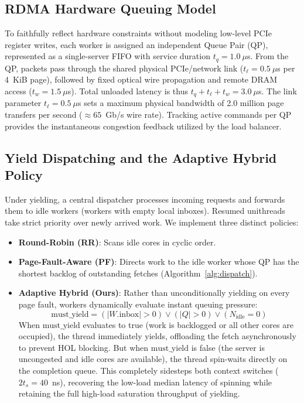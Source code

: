 \subsection{RDMA Hardware Queuing Model}
To faithfully reflect hardware constraints without modeling low-level PCIe register writes, each worker is assigned an independent Queue Pair (QP), represented as a single-server FIFO with service duration $t_q = 1.0~\mu$s. From the QP, packets pass through the shared physical PCIe/network link ($t_\ell = 0.5~\mu$s per 4~KiB page), followed by fixed optical wire propagation and remote DRAM access ($t_w = 1.5~\mu$s). Total unloaded latency is thus $t_q + t_\ell + t_w = 3.0~\mu$s. The link parameter $t_\ell = 0.5~\mu$s sets a maximum physical bandwidth of 2.0 million page transfers per second ($\approx 65$~Gb/s wire rate). Tracking active commands per QP provides the instantaneous congestion feedback utilized by the load balancer.

\subsection{Yield Dispatching and the Adaptive Hybrid Policy}
Under yielding, a central dispatcher processes incoming requests and forwards them to idle workers (workers with empty local inboxes). Resumed unithreads take strict priority over newly arrived work. We implement three distinct policies:
\begin{itemize}
\item \textbf{Round-Robin (RR)}: Scans idle cores in cyclic order.
\item \textbf{Page-Fault-Aware (PF)}: Directs work to the idle worker whose QP has the shortest backlog of outstanding fetches (Algorithm~\ref{alg:dispatch}).
\item \textbf{Adaptive Hybrid (Ours)}: Rather than unconditionally yielding on every page fault, workers dynamically evaluate instant queuing pressure:
\begin{equation}
\label{eq:must_yield}
\text{must\_yield} = (|W.\text{inbox}| > 0) \lor (|Q| > 0) \lor (N_{\text{idle}} = 0)
\end{equation}
When $\text{must\_yield}$ evaluates to true (work is backlogged or all other cores are occupied), the thread immediately yields, offloading the fetch asynchronously to prevent HOL blocking. But when $\text{must\_yield}$ is false (the server is uncongested and idle cores are available), the thread spin-waits directly on the completion queue. This completely sidesteps both context switches ($2t_s = 40$~ns), recovering the low-load median latency of spinning while retaining the full high-load saturation throughput of yielding.
\end{itemize}

